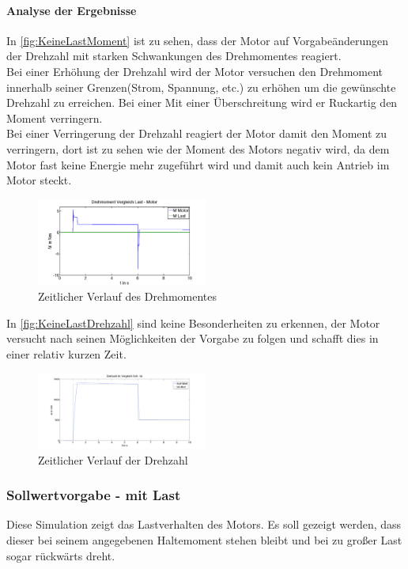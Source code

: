\paragraph{Analyse der Ergebnisse}
	In \autoref{fig:KeineLastMoment} ist zu sehen, dass der Motor auf Vorgabeänderungen der Drehzahl mit starken Schwankungen des Drehmomentes reagiert.\\
	Bei einer Erhöhung der Drehzahl wird der Motor versuchen den Drehmoment innerhalb seiner Grenzen(Strom, Spannung, etc.) zu erhöhen um die gewünschte Drehzahl zu erreichen. Bei einer Mit einer Überschreitung wird er Ruckartig den Moment verringern.\\
	Bei einer Verringerung der Drehzahl reagiert der Motor damit den Moment zu verringern, dort ist zu sehen wie der Moment des Motors negativ wird, da dem Motor fast keine Energie mehr zugeführt wird und damit auch kein Antrieb im Motor steckt.
	\begin{figure}[H]
		\includegraphics[width=0.5\textwidth]{pictures/KeineLastMoment.png}
		\caption{Zeitlicher Verlauf des Drehmomentes}
		\label{fig:KeineLastMoment}
	\end{figure}	
	In \autoref{fig:KeineLastDrehzahl} sind keine Besonderheiten zu erkennen, der Motor versucht nach seinen Möglichkeiten der Vorgabe zu folgen und schafft dies in einer relativ kurzen Zeit.
	\begin{figure}[H]
		\includegraphics[width=0.5\textwidth]{pictures/KeineLastDrehzahl.png}
		\caption{Zeitlicher Verlauf der Drehzahl}
		\label{fig:KeineLastDrehzahl}
	\end{figure}	
\subsubsection{Sollwertvorgabe - mit Last}
Diese Simulation zeigt das Lastverhalten des Motors. Es soll gezeigt werden, dass dieser bei seinem angegebenen Haltemoment stehen bleibt und bei zu großer Last sogar rückwärts dreht.
